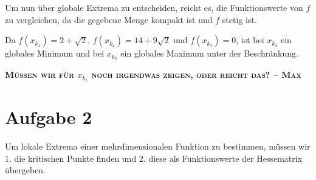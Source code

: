 \documentclass[10pt,a4paper,parskip=half]{scrartcl}
\begin{document}
Um nun über globale Extrema zu entscheiden, reicht es, die Funktionswerte von $f$ zu vergleichen, da die gegebene Menge kompakt ist und $f$ stetig ist.

Da $f(x_{k_1}) = 2 + \sqrt 2$, $f(x_{k_2}) = 14+9 \sqrt{2}$ und $f(x_{k_3}) = 0$, ist bei $x_{k_3}$ ein globales Minimum und bei $x_{k_2}$ ein globales Maximum unter der Beschränkung.

\textbf{\textsc{Müssen wir für $x_{k_1}$ noch irgendwas zeigen, oder reicht das? -- Max}}

\section*{Aufgabe 2}
Um lokale Extrema einer mehrdimensionalen Funktion zu bestimmen, müssen wir 1. die kritischen Punkte finden und 2. diese als Funktionswerte der Hessematrix übergeben.
\end{document}
